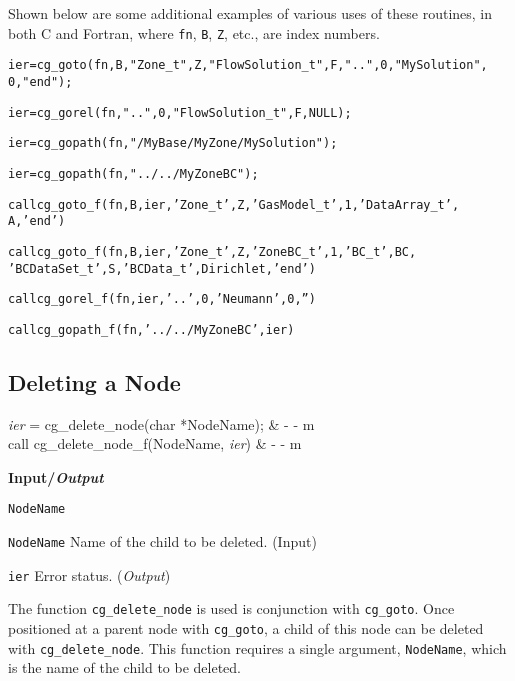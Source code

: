 Shown below are some additional examples of various uses of these
routines, in both C and Fortran, where \texttt{fn}, \texttt{B},
\texttt{Z}, etc., are index numbers.

\begin{alltt}
   ier = cg\_goto(fn, B, "Zone\_t", Z, "FlowSolution\_t", F, "..", 0, "MySolution",
                 0, "end");

   ier = cg\_gorel(fn, "..", 0, "FlowSolution\_t", F, NULL);

   ier = cg\_gopath(fn, "/MyBase/MyZone/MySolution");

   ier = cg\_gopath(fn, "../../MyZoneBC");

   call cg\_goto\_f(fn, B, ier, 'Zone\_t', Z, 'GasModel\_t', 1, 'DataArray\_t',
                  A, 'end')

   call cg\_goto\_f(fn, B, ier, 'Zone\_t', Z, 'ZoneBC\_t', 1, 'BC\_t', BC,
                  'BCDataSet\_t', S, 'BCData\_t', Dirichlet, 'end')

   call cg\_gorel\_f(fn, ier, '..', 0, 'Neumann', 0, '')

   call cg\_gopath\_f(fn, '../../MyZoneBC', ier)
\end{alltt}

\subsection{Deleting a Node}
\label{s:delete}

\begin{fctbox}
\textcolor{output}{\textit{ier}} = cg\_delete\_node(\textcolor{input}{char *NodeName}); & - - m \\
\hline
call cg\_delete\_node\_f(\textcolor{input}{NodeName}, \textcolor{output}{\textit{ier}}) & - - m \\
\end{fctbox}

\noindent
\textbf{\textcolor{input}{Input}/\textcolor{output}{\textit{Output}}}


\begin{Ventryi}{\texttt{NodeName}}\raggedright
\item [\texttt{NodeName}]
      Name of the child to be deleted.
      (\textcolor{input}{Input})
\item [\texttt{ier}]
      Error status.
      (\textcolor{output}{\textit{Output}})
\end{Ventryi}

The function \texttt{cg\_delete\_node} is used is conjunction with
\texttt{cg\_goto}.
Once positioned at a parent node with \texttt{cg\_goto}, a child of
this node can be deleted with \texttt{cg\_delete\_node}.
This function requires a single argument, \texttt{NodeName}, which is
the name of the child to be deleted.

